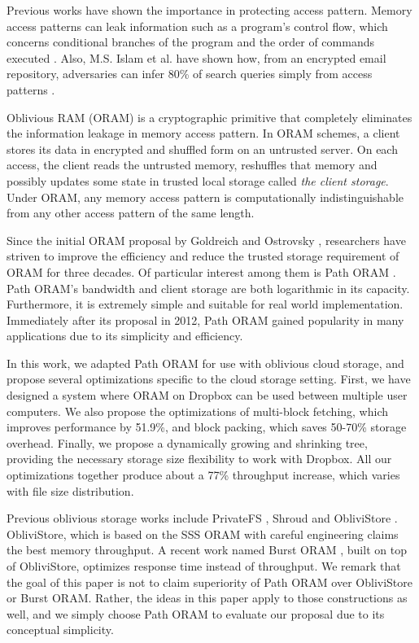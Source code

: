 \documentclass[conference]{IEEEtran}
\begin{document}
Previous works have shown the importance in protecting access pattern. Memory access patterns can leak information such as a program’s control flow, which concerns conditional branches of the program and the order of commands executed \cite{HIDE}. Also, M.S. Islam et al. have shown how, from an encrypted email repository, adversaries can infer 80\% of search queries simply from access patterns \cite{Islam12}.

Oblivious RAM (ORAM) is a cryptographic primitive that completely eliminates the information leakage in memory access pattern.
In ORAM schemes, a client stores its data in encrypted and shuffled form on an untrusted server.
On each access, the client reads the untrusted memory, reshuffles that memory and possibly updates some state in trusted local storage called \emph{the client storage}.
Under ORAM, any memory access pattern is computationally indistinguishable from any other access pattern of the same length.

Since the initial ORAM proposal by Goldreich and Ostrovsky \cite{G87, O90, GO96}, researchers have striven to improve the efficiency and reduce the trusted storage requirement of ORAM \cite{OS97, WS08, BMP11, WS12, GM11, GMOT12, Kush12, SSS12, SCSL11, GENTRY13, PathORAM} for three decades. 
Of particular interest among them is Path ORAM \cite{PathORAM}.
Path ORAM’s bandwidth and client storage are both logarithmic in its capacity.
Furthermore, it is extremely simple and suitable for real world implementation. 
Immediately after its proposal in 2012, Path ORAM gained popularity in many applications due to its simplicity and efficiency. 

In this work, we adapted Path ORAM for use with oblivious cloud storage, and propose several optimizations specific to the cloud storage setting.
First, we have designed a system where ORAM on Dropbox can be used between multiple user computers. 
We also propose the optimizations of multi-block fetching, which improves performance by 51.9\%, and block packing, which saves 50-70\% storage overhead. 
Finally, we propose a dynamically growing and shrinking tree, providing the necessary storage size flexibility to work with Dropbox. All our optimizations together produce about a 77\% throughput increase, which varies with file size distribution.


Previous oblivious storage works include PrivateFS \cite{PrivateFS}, Shroud \cite{Shroud} and ObliviStore \cite{oblivistore}.
ObliviStore, which is based on the SSS ORAM \cite{SSS12} with careful engineering claims the best memory throughput.
A recent work named Burst ORAM \cite{BurstORAM}, built on top of ObliviStore, optimizes response time instead of throughput.
We remark that the goal of this paper is not to claim superiority of Path ORAM over ObliviStore or Burst ORAM.
Rather, the ideas in this paper apply to those constructions as well, and we simply choose Path ORAM to evaluate our proposal due to its conceptual simplicity. 
\end{document}

